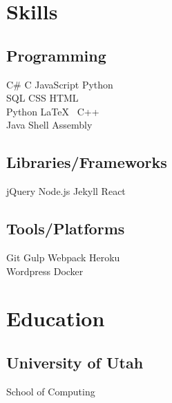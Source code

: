 \documentclass[]{plushcv}
\begin{document}
\begin{minipage}[t]{0.25\textwidth}


\section{Skills}
\subsection{Programming}
\sectionsep
{}
C\# \textbullet{} C \textbullet{} JavaScript \textbullet{} Python    \\ SQL \textbullet{} CSS \textbullet{} HTML \textbullet{} \\
\sectionsep
{}
Python \textbullet{} \LaTeX\ \textbullet{}  C++  \\
\sectionsep
{}
Java \textbullet{}  Shell \textbullet{} Assembly \\
\sectionsep
\sectionsep
\subsection{Libraries/Frameworks}
\sectionsep
jQuery \textbullet{} Node.js \textbullet{} Jekyll \textbullet{} React \\
\sectionsep
\sectionsep
\subsection{Tools/Platforms}
\sectionsep
Git \textbullet{} Gulp \textbullet{} Webpack \textbullet{} Heroku    \\ Wordpress \textbullet{} Docker \\

\sectionsep


\section{Education}
\subsection{University of Utah}
School of Computing \\


\end{minipage}
\end{document}
